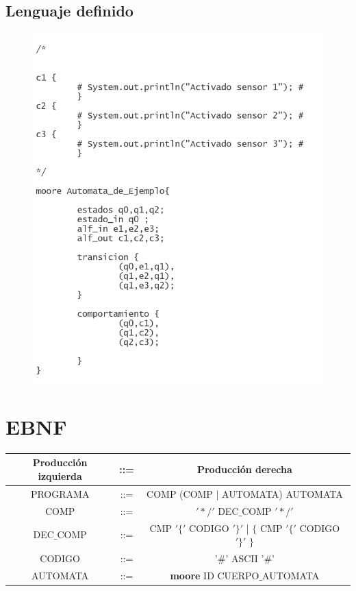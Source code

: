 \documentclass[12pt,a4paper]{article}
\begin{document}
{	\subsection{Lenguaje definido}
	\begin{center}
		\begin{figure}[h]
			\centering
			\includegraphics[width=0.7\linewidth]{img/automata2}
			\caption{}
			\label{fig:automata2}
		\end{figure}
	\end{center}
	
	

	\newpage
	\section{EBNF}
			\begin{center}
			\begin{tabular}{|c|c|c|}
				\hline 
		\textbf{Producción izquierda} & ::= & \textbf{Producción derecha} \\ 
				\hline 
				PROGRAMA & ::= & COMP (COMP | AUTOMATA) { AUTOMATA} \\ 
				\hline 
				COMP  &  ::= & $'\ast/'$ DEC$\_$COMP $'\ast/'$ \\ 
				\hline 
				DEC$\_$COMP & ::= & CMP $'\{'$ CODIGO $'\}'$ | $\{$ CMP $'\{'$ CODIGO $'\}'$ $\}$ \\ 
				\hline 
				CODIGO 	& ::=  & '$\#$' ASCII '$\#$' \\ 
				\hline 
				AUTOMATA & ::= & \textbf{moore} ID CUERPO$\_$AUTOMATA \\
				\hline 
			

\end{tabular}
\end{center}}
\end{document}
